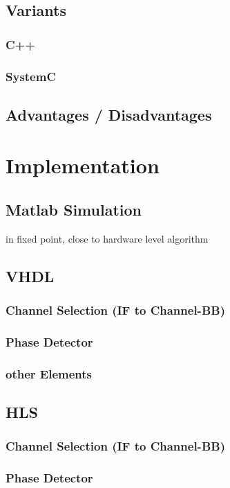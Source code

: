   \section{Variants}
    \subsection{C++}
    \subsection{SystemC}
  \section{Advantages / Disadvantages}


\chapter{Implementation}
  \section{Matlab Simulation}
  in fixed point, close to hardware level algorithm

  \section{VHDL}
    \subsection{Channel Selection (IF to Channel-BB)}
    \subsection{Phase Detector}
    \subsection{other Elements}

  \section{HLS}
    \subsection{Channel Selection (IF to Channel-BB)}
    \subsection{Phase Detector}
